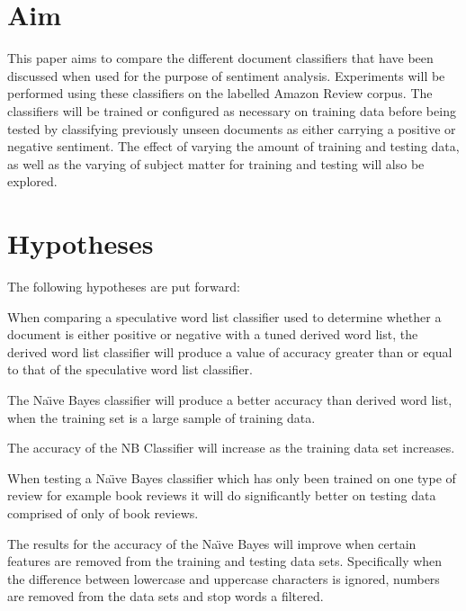 \documentclass{llncs}
\begin{document}
\section{Aim}
This paper aims to compare the different document classifiers that have been discussed when used for the purpose of sentiment analysis. Experiments will be performed using these classifiers on the labelled Amazon Review corpus. The classifiers will be trained or configured as necessary on training data before being tested by classifying previously unseen documents as either carrying a positive or negative sentiment. The effect of varying the amount of training and testing data, as well as the varying of subject matter for training and testing will also be explored.

\section{Hypotheses} %
\label{sec:hypotheses}
The following hypotheses are put forward:

\begin{hypotheses}
    \item \label{hyp:h1} When comparing a speculative word list classifier used to determine whether a document is either positive or negative with a tuned derived word list, the derived word list classifier will produce a value of accuracy greater than or equal to that of the speculative word list classifier.
    
    \item \label{hyp:h2} The Na\"\i ve Bayes classifier will produce a better accuracy than derived word list, when the training set is a large sample of training data.
    
    \item \label{hyp:h3} The accuracy of the NB Classifier will increase as the training data set increases.
    
    \item \label{hyp:h4} When testing a Na\"\i ve Bayes classifier which has only been trained on one type of review for example book reviews it will do significantly better on testing data comprised of only of book reviews.
    
    \item \label{hyp:h5} The results for the accuracy of the Na\"\i ve Bayes will improve when certain features are removed from the training and testing data sets. Specifically when the difference between lowercase and uppercase characters is ignored, numbers are removed from the data sets and stop words a filtered.
\end{hypotheses}
\end{document}
